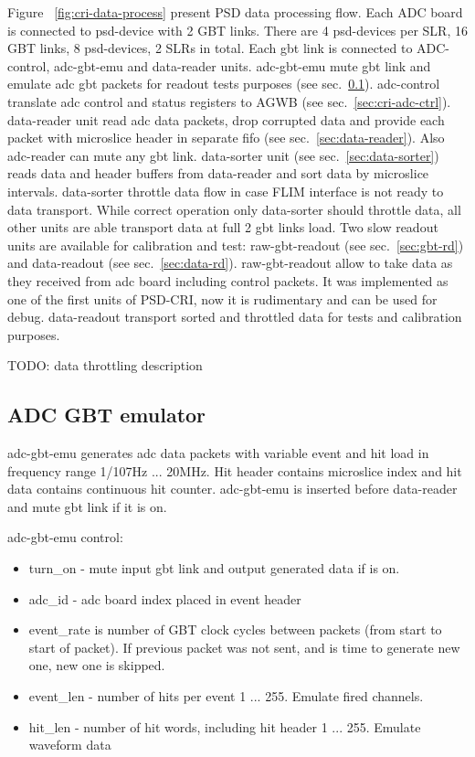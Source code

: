 \documentclass{article}
\begin{document}
Figure ~\ref{fig:cri-data-process} present PSD data processing flow. Each ADC board is connected to psd-device with 2 GBT links. There are 4 psd-devices per SLR, 16 GBT links, 8 psd-devices, 2 SLRs in total. Each gbt link is connected to ADC-control, adc-gbt-emu and data-reader units. adc-gbt-emu mute gbt link and emulate adc gbt packets for readout tests purposes (see sec.~\ref{sec:gbt-emu}). adc-control translate adc control and status registers to AGWB (see sec.~\ref{sec:cri-adc-ctrl}). data-reader unit read adc data packets, drop corrupted data and provide each packet with microslice header in separate fifo (see sec.~\ref{sec:data-reader}). Also adc-reader can mute any gbt link. data-sorter unit (see sec.~\ref{sec:data-sorter}) reads data and header buffers from data-reader and sort data by microslice intervals. data-sorter throttle data flow in case FLIM interface is not ready to data transport. While correct operation only data-sorter should throttle data, all other units are able transport data at full 2 gbt links load. Two slow readout units are available for calibration and test: raw-gbt-readout (see sec.~\ref{sec:gbt-rd}) and data-readout (see sec.~\ref{sec:data-rd}). raw-gbt-readout allow to take data as they received from adc board including control packets. It was implemented as one of the first units of PSD-CRI, now it is rudimentary and can be used for debug. data-readout transport sorted and throttled data for tests and calibration purposes.

TODO: data throttling description



\subsection{ADC GBT emulator}\label{sec:gbt-emu}
adc-gbt-emu generates adc data packets with variable event and hit load in frequency range 1/107Hz ... 20MHz.
Hit header contains microslice index and hit data contains continuous hit counter. adc-gbt-emu is inserted before data-reader and mute gbt link if it is on.

adc-gbt-emu control:
\begin{itemize}
\item turn\_on - mute input gbt link and output generated data if is on.
\item adc\_id - adc board index placed in event header
\item event\_rate is number of GBT clock cycles between packets (from start to start of packet). If previous packet was not sent, and is time to generate new one, new one is skipped.
\item event\_len - number of hits per event 1 ... 255. Emulate fired channels.
\item hit\_len - number of hit words, including hit header 1 ... 255. Emulate waveform data
\end{itemize}
\end{document}
